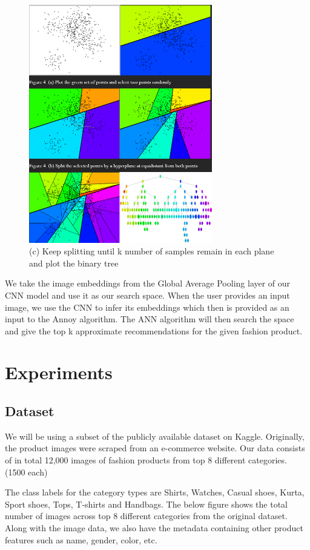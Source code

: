 \documentclass[12pt,twocolumn,letterpaper,Times New Roman]{article}
\begin{document}
\begin{figure}[!h]
    \centering
    \includegraphics[width=80mm]{fig_4.png}
    \caption{(c) Keep splitting until k number of samples remain in each plane and plot the binary tree}
    \label{fig:11}
\end{figure}

We take the image embeddings from the Global Average Pooling layer of our CNN model and use it as our search space. When the user provides an input image, we use the CNN to infer its embeddings which then is provided as an input to the Annoy algorithm. The ANN algorithm will then search the space and give the top k approximate recommendations for the given fashion product.

\section{Experiments}

\subsection{Dataset}

We will be using a subset of the publicly available dataset on Kaggle. Originally, the product images were scraped from an e-commerce website. Our data consists of in total 12,000 images of fashion products from top 8 different categories. (1500 each) 

The class labels for the category types are Shirts, Watches, Casual shoes, Kurta, Sport shoes, Tops, T-shirts and Handbags. The below figure shows the total number of images across top 8 different categories from the original dataset. Along with the image data, we also have the metadata containing other product features such as name, gender, color, etc.
\end{document}
